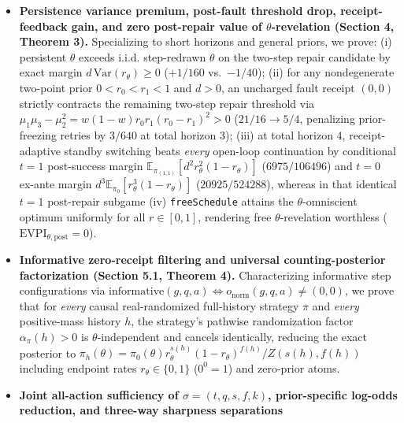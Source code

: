 \documentclass[11pt,a4paper]{article}
\begin{document}
\begin{itemize}
  (\(53/32 \to 97/64\), gap \(9/64\)) from closing \texttt{child1} after
  \(t=0\), and the single-try specialization
  \(V_{H+1}^* = \max\{0, \Delta_0\}\) whenever \(p \ge p_1^*\) (in
  particular whenever \(p \ge S_H(d)\)), alongside \(V_H^* = 0\)
  whenever \(B_0 < c\).
\item
  \textbf{Persistence variance premium, post-fault threshold drop,
  receipt-feedback gain, and zero post-repair value of
  \(\theta\)-revelation (Section 4, Theorem 3).} Specializing to short
  horizons and general priors, we prove: (i) persistent \(\theta\)
  exceeds i.i.d. step-redrawn \(\theta\) on the two-step repair
  candidate by exact margin \(d\,\mathrm{Var}(r_\theta) \ge 0\)
  (\(+1/160\) vs.~\(-1/40\)); (ii) for any nondegenerate two-point prior
  \(0 < r_0 < r_1 < 1\) and \(d > 0\), an uncharged fault receipt
  \((0,0)\) strictly contracts the remaining two-step repair threshold
  via \(\mu_1\mu_3 - \mu_2^2 = w(1-w)r_0 r_1(r_0 - r_1)^2 > 0\)
  (\(21/16 \to 5/4\), penalizing prior-freezing retries by \(3/640\) at
  total horizon \(3\)); (iii) at total horizon \(4\), receipt-adaptive
  standby switching beats \emph{every} open-loop continuation by
  conditional \(t=1\) post-success margin
  \(\mathbb{E}_{\pi_{(1,1)}}[d^2 r_\theta^2(1 - r_\theta)]\)
  (\(6975/106496\)) and \(t=0\) ex-ante margin
  \(d^3 \mathbb{E}_{\pi_0}[r_\theta^3(1 - r_\theta)]\)
  (\(20925/524288\)), whereas in that identical \(t=1\) post-repair
  subgame (iv) \texttt{freeSchedule} attains the \(\theta\)-omniscient
  optimum uniformly for all \(r \in [0,1]\), rendering free
  \(\theta\)-revelation worthless
  (\(\mathrm{EVPI}_{\theta,\mathrm{post}} = 0\)).
\item
  \textbf{Informative zero-receipt filtering and universal
  counting-posterior factorization (Section 5.1, Theorem 4).}
  Characterizing informative step configurations via
  \(\mathrm{informative}(g, q, a) \iff o_{\mathrm{norm}}(g, q, a) \neq (0,0)\),
  we prove that for \emph{every} causal real-randomized full-history
  strategy \(\pi\) and \emph{every} positive-mass history \(h\), the
  strategy's pathwise randomization factor \(\alpha_\pi(h) > 0\) is
  \(\theta\)-independent and cancels identically, reducing the exact
  posterior to
  \(\pi_h(\theta) = \pi_0(\theta) r_\theta^{s(h)}(1 - r_\theta)^{f(h)} / Z(s(h), f(h))\)
  including endpoint rates \(r_\theta \in \{0,1\}\) (\(0^0 = 1\)) and
  zero-prior atoms.
\item
  \textbf{Joint all-action sufficiency of \(\sigma = (t, q, s, f, k)\),
  prior-specific log-odds reduction, and three-way sharpness separations
}
\end{itemize}
\end{document}
